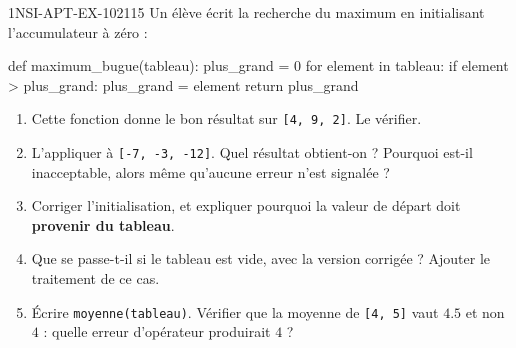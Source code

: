 \begin{exercice}{1NSI-APT-EX-102}{1}{15}
Un élève écrit la recherche du maximum en initialisant l'accumulateur à zéro :
\begin{python}
def maximum_bugue(tableau):
    plus_grand = 0
    for element in tableau:
        if element > plus_grand:
            plus_grand = element
    return plus_grand
\end{python}
\begin{enumerate}
  \item Cette fonction donne le bon résultat sur \lstinline{[4, 9, 2]}. Le vérifier.
  \item L'appliquer à \lstinline{[-7, -3, -12]}. Quel résultat obtient-on ? Pourquoi est-il
    inacceptable, alors même qu'aucune erreur n'est signalée ?
  \item Corriger l'initialisation, et expliquer pourquoi la valeur de départ doit
    \textbf{provenir du tableau}.
  \item Que se passe-t-il si le tableau est vide, avec la version corrigée ? Ajouter le
    traitement de ce cas.
  \item Écrire \lstinline{moyenne(tableau)}. Vérifier que la moyenne de \lstinline{[4, 5]}
    vaut $4.5$ et non $4$ : quelle erreur d'opérateur produirait $4$ ?
\end{enumerate}
\end{exercice}

